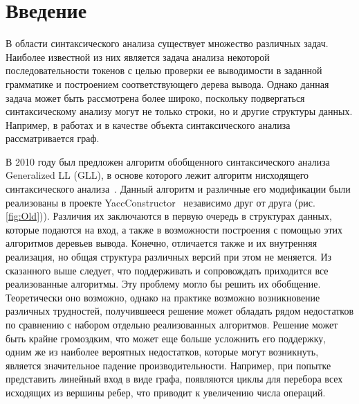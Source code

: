 \documentclass[14pt]{matmex-diploma}
\begin{document}
\maketitle
\tableofcontents

\section*{Введение}
В области синтаксического анализа существует множество различных задач. Наиболее известной из них является задача анализа некоторой последовательности токенов с целью проверки ее выводимости в заданной грамматике и построением соответствующего дерева вывода. Однако данная задача может быть рассмотрена более широко, поскольку подвергаться синтаксическому анализу могут не только строки, но и другие структуры данных. Например, в работах \cite{graphParseVerb} и \cite{graphParseRag} в качестве объекта синтаксического анализа рассматривается граф.

В 2010 году был предложен алгоритм обобщенного синтаксического анализа Generalized LL (GLL), в основе которого лежит алгоритм нисходящего синтаксического анализа~\cite{GLLParsing}. Данный алгоритм и различные его модификации были реализованы в проекте YaccConstructor~\cite{YaccConstructor} независимо друг от друга (рис. \ref{fig:Old})). Различия их заключаются в первую очередь в структурах данных, которые подаются на вход, а также в возможности построения с помощью этих алгоритмов деревьев вывода. Конечно, отличается также и их внутренняя реализация, но общая структура различных версий при этом не меняется. Из сказанного выше следует, что поддерживать и сопровождать приходится все реализованные алгоритмы. Эту проблему могло бы решить их обобщение. Теоретически оно возможно, однако на практике возможно возникновение различных трудностей, получившееся решение может обладать рядом недостатков по сравнению с набором отдельно реализованных алгоритмов. Решение может быть крайне громоздким, что может еще больше усложнить его поддержку, одним же из наиболее вероятных недостатков, которые могут возникнуть, является значительное падение производительности. Например, при попытке представить линейный вход в виде графа, появляются циклы для перебора всех исходящих из вершины ребер, что приводит к увеличению числа операций.
\end{document}
